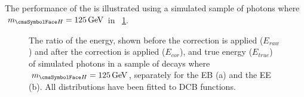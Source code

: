 The performance of the \PhoEnergyBdt is illustrated using a simulated sample of \Hgg photons where $\mH=125\GeV$ in \Fig~\ref{fig:reco:pho_regression}.

\begin{figure}[h]
\centering
\caption{The ratio of the \SC energy, shown before the \PhoEnergyBdt correction is applied ($E_{raw}$) and after the correction is applied ($E_{cor}$), and true energy ($E_{true}$) of simulated photons in a sample of \Hgg decays where $\mH=125\GeV$, separately for the EB (a) and the EE (b). All distributions have been fitted to DCB functions.}

\label{fig:reco:pho_regression}
\end{figure}


